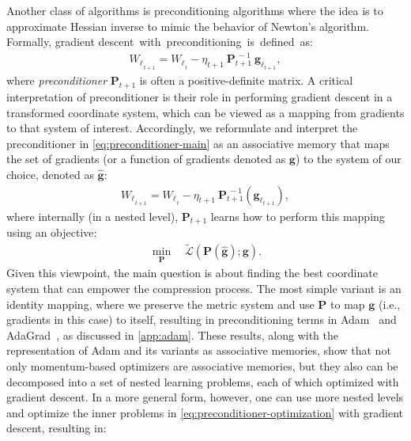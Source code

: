 \documentclass{article}
\newcommand{\citep}{\parencite}
\newcommand{\head}[1]{\vspace{1.7mm}\noindent{{\textcolor{c4}{\bf #1.}}}}
\begin{document}
\head{Preconditioning and Approximation of Hessian} 
Another class of algorithms is preconditioning algorithms where the idea is to approximate Hessian inverse to mimic the behavior of Newton's algorithm. 
Formally, gradient descent~with~preconditioning~is~defined~as:
\begin{align}\label{eq:preconditioner-main}
    {W_{\ell}}_{_{t+1}} = {W_{\ell}}_{_{t}} - \eta_{t+1} \: \boldsymbol{P}^{\:-1}_{t+1} \:{\boldsymbol{g}_{\ell_{t+1}}},
\end{align}
where \emph{preconditioner} $\boldsymbol{P}_{t+1}$ is often a positive-definite matrix. A critical interpretation of preconditioner is their role in performing gradient descent in a  transformed coordinate system, which can be viewed as a mapping from gradients to that system of interest. Accordingly, we reformulate and interpret the preconditioner in \autoref{eq:preconditioner-main} as an associative memory that maps the set of gradients (or a function of gradients denoted as $\boldsymbol{g}$) to the system of our choice, denoted as $\hat{\boldsymbol{g}}$:
\begin{align}\label{eq:preconditioner-memory}
    {W_{\ell}}_{_{t+1}} = {W_{\ell}}_{_{t}} - \eta_{t+1} \: \boldsymbol{P}_{t+1}^{\:-1} \!\left({\boldsymbol{g}_{\ell_{t+1}}}\right),
\end{align}
where internally (in a nested level), $\boldsymbol{P}_{t+1}$ learns how to perform this mapping using an objective:
\begin{align}\label{eq:preconditioner-optimization}
\min_{\boldsymbol{P}} \quad   \tilde{\mathcal{L}} \left( \boldsymbol{P}\left( \hat{\boldsymbol{g}} \right); \boldsymbol{g} \right).
\end{align}
Given this viewpoint, the main question is about finding the best coordinate system that can empower the compression process. The most simple variant is an identity mapping, where we preserve the metric system and use $\boldsymbol{P}$ to map $\boldsymbol{g}$ (i.e., gradients in this case) to itself, resulting in preconditioning terms in Adam~\citep{kingma2014adam} and AdaGrad~\citep{duchi2011adaptive}, as discussed in \autoref{app:adam}. These results, along with the representation of Adam and its variants as associative memories, show that not only momentum-based optimizers are associative memories, but they also can be decomposed into a set of nested learning problems, each of which optimized with gradient descent. In a more general form, however, one can use more nested levels and optimize the inner problems in \autoref{eq:preconditioner-optimization} with gradient descent, resulting in:
\end{document}
